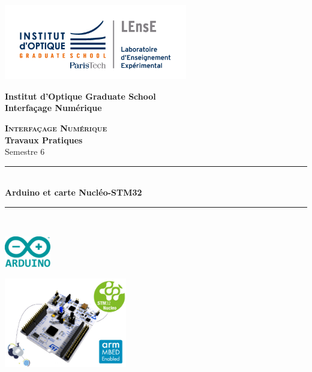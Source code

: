 \documentclass[a4paper,11pt,titlepage]{article} %
\begin{document}
\begin{titlepage}

\begin{center}
	\begin{minipage}{2.5cm}
	\begin{center}
		\includegraphics[width=8cm]{images/Logo-LEnsE.png}
	\end{center}
\end{minipage}\hfill
\begin{minipage}{10cm}
	\begin{center}
	\textbf{Institut d'Optique Graduate School }\\[0.1cm]
    \textbf{Interfaçage Numérique}


	\end{center}
\end{minipage}\hfill


\vspace{4cm}


{\huge \bfseries \textsc{Interfaçage Numérique}} \\[0.5cm]
{\large \bfseries Travaux Pratiques} \\[0.2cm]
Semestre 6

\vspace{2cm}
\rule{\linewidth}{0.3mm} \\[0.4cm]
{ \huge \bfseries\color{violet_iogs} Arduino et carte Nucléo-STM32 \\[0.4cm] }
\rule{\linewidth}{0.3mm} \\[1cm]

\begin{center}
	\includegraphics[width=0.15\textwidth]{images/Arduino_Logo.png}

	\bigskip
	
	\includegraphics[width=0.4\textwidth]{images/nucleo_board.jpg}	
\end{center}

\vfill


\end{center}
\end{titlepage}
\end{document}
